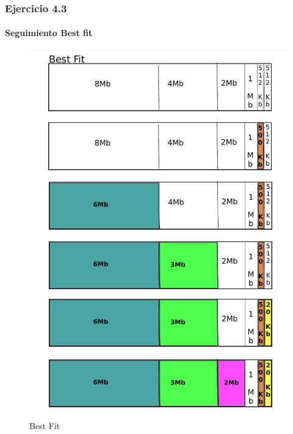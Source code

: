\documentclass{beamer}
\begin{document}
\begin{frame}
  \frametitle{Ejercicio 4.3}
  \framesubtitle{Seguimiento Best fit}
   \begin{figure}[h!]
    \centering        
      \includegraphics[scale=0.25]{best-fit.pdf}
    \caption{Best Fit}
  \end{figure}
\end{frame}
\end{document}
